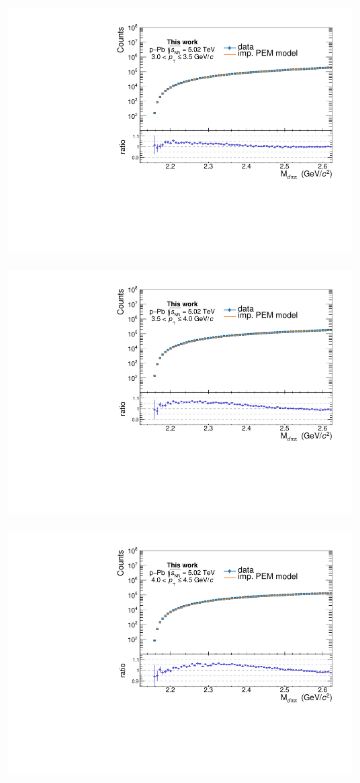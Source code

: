 \begin{appendices}
\begin{figure}[htb]
\begin{subfigure}{.5\textwidth}
  \includegraphics[width=\linewidth]{gfx/appendix/backsub/can_unblind6}
  \caption{}
\end{subfigure}%
\begin{subfigure}{.5\textwidth}
  \centering
  \captionsetup{justification=centering}
  \includegraphics[width=\linewidth]{gfx/appendix/backsub/can_unblind7}
  \caption{}
\end{subfigure}
\begin{subfigure}{.5\textwidth}
  \centering
  \captionsetup{justification=centering}
  \includegraphics[width=\linewidth]{gfx/appendix/backsub/can_unblind8}

\end{subfigure}
\end{figure}
\end{appendices}
